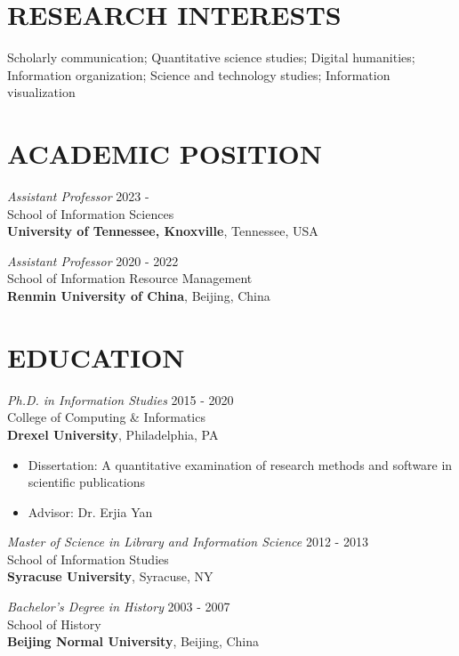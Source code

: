 \documentclass[margin, 10pt]{res} %
\begin{document}
\begin{resume}


\section{RESEARCH INTERESTS}  

Scholarly communication; Quantitative science studies; Digital humanities; Information organization; Science and technology studies; Information visualization

\section{ACADEMIC POSITION}

{\sl Assistant Professor} \hfill 2023 -  \\
School of Information Sciences\\
\textbf{University of Tennessee, Knoxville}, Tennessee, USA

{\sl Assistant Professor} \hfill 2020 - 2022 \\
School of Information Resource Management\\
\textbf{Renmin University of China}, Beijing, China

\section{EDUCATION}

{\sl Ph.D. in Information Studies} \hfill 2015 - 2020 \\
College of Computing \& Informatics\\
\textbf{Drexel University}, Philadelphia, PA
\begin{itemize}
\item Dissertation: A quantitative examination of research methods and software in scientific publications
\item Advisor: Dr. Erjia Yan
\end{itemize} 

{\sl Master of Science in Library and Information Science} \hfill 2012 - 2013 \\
School of Information Studies\\
\textbf{Syracuse University}, Syracuse, NY
 
{\sl Bachelor’s Degree in History} \hfill 2003 - 2007\\
School of History\\
\textbf{Beijing Normal University}, Beijing, China


\end{resume}
\end{document}
